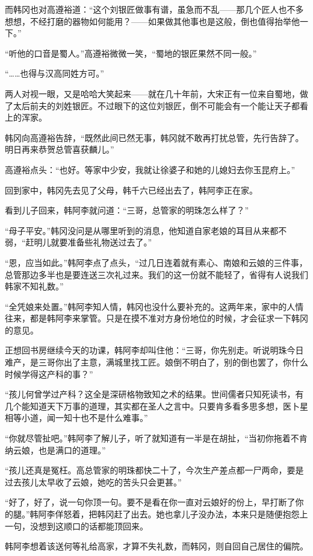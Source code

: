 而韩冈也对高遵裕道：“这个刘银匠做事有谱，虽急而不乱——那几个匠人也不多想想，不经打磨的器物如何能用？——如果做其他事也是这般，倒也值得抬举他一下。”

“听他的口音是蜀人。”高遵裕微微一笑，“蜀地的银匠果然不同一般。”

“……也得与汉高同姓方可。”

两人对视一眼，又是哈哈大笑起来——就在几十年前，大宋正有一位来自蜀地，做了太后前夫的刘姓银匠。不过眼下的这位刘银匠，倒不可能会有一个能让天子都看上的浑家。

韩冈向高遵裕告辞，“既然此间已然无事，韩冈就不敢再打扰总管，先行告辞了。明日再来恭贺总管喜获麟儿。”

高遵裕点头：“也好。等家中少安，我就让徐婆子和她的儿媳妇去你玉昆府上。”

回到家中，韩冈先去见了父母，韩千六已经出去了，韩阿李正在家。

看到儿子回来，韩阿李就问道：“三哥，总管家的明珠怎么样了？”

“母子平安。”韩冈没问是从哪里听到的消息，他知道自家老娘的耳目从来都不弱，“赶明儿就要准备些礼物送过去了。”

“恩，应当如此。”韩阿李点了点头，“过几日连着就有素心、南娘和云娘的三件事，总管那边多半也是要连送三次礼过来。我们的这一份就不能轻了，省得有人说我们韩家不知礼数。”

“全凭娘来处置。”韩阿李知人情，韩冈也没什么要补充的。这两年来，家中的人情往来，都是韩阿李来掌管。只是在摸不准对方身份地位的时候，才会征求一下韩冈的意见。

正想回书房继续今天的功课，韩阿李却叫住他：“三哥，你先别走。听说明珠今日难产，是三哥你出了主意，满城里找工匠。娘倒不明白了，别的倒也罢了，你什么时候学得这产科的事？”

“孩儿何曾学过产科？这全是深研格物致知之术的结果。世间儒者只知死读书，有几个能知道天下万事的道理，其实都在圣人之言中。只要肯多看多思多想，医卜星相等小道，闻一知十也不是什么难事。”

“你就尽管扯吧。”韩阿李了解儿子，听了就知道有一半是在胡扯，“当初你拖着不肯纳云娘，也是满口的道理。”

“孩儿还真是冤枉。高总管家的明珠都快二十了，今次生产差点都一尸两命，要是过去孩儿太早收了云娘，她吃的苦头只会更甚。”

“好了，好了，说一句你顶一句。要不是看在你一直对云娘好的份上，早打断了你的腿。”韩阿李佯怒着，把韩冈赶了出去。她也拿儿子没办法，本来只是随便抱怨上一句，没想到这顺口的话都能顶回来。

韩阿李想着该送何等礼给高家，才算不失礼数，而韩冈，则自回自己居住的偏院。

